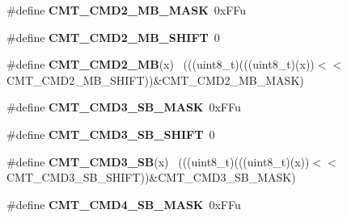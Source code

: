 \begin{DoxyCompactItemize}
\item 
\hypertarget{group___c_m_t___register___masks_gac9616164033684cd0d73e63eb6381441}{}\#define {\bfseries C\+M\+T\+\_\+\+C\+M\+D2\+\_\+\+M\+B\+\_\+\+M\+A\+S\+K}~0x\+F\+Fu\label{group___c_m_t___register___masks_gac9616164033684cd0d73e63eb6381441}

\item 
\hypertarget{group___c_m_t___register___masks_gaeff28d00f2825fc455b2f37c218ce24f}{}\#define {\bfseries C\+M\+T\+\_\+\+C\+M\+D2\+\_\+\+M\+B\+\_\+\+S\+H\+I\+F\+T}~0\label{group___c_m_t___register___masks_gaeff28d00f2825fc455b2f37c218ce24f}

\item 
\hypertarget{group___c_m_t___register___masks_gab2a79ddcd28a1921a654f06e9c9cb15f}{}\#define {\bfseries C\+M\+T\+\_\+\+C\+M\+D2\+\_\+\+M\+B}(x)                                                  ~(((uint8\+\_\+t)(((uint8\+\_\+t)(x))$<$$<$C\+M\+T\+\_\+\+C\+M\+D2\+\_\+\+M\+B\+\_\+\+S\+H\+I\+F\+T))\&C\+M\+T\+\_\+\+C\+M\+D2\+\_\+\+M\+B\+\_\+\+M\+A\+S\+K)\label{group___c_m_t___register___masks_gab2a79ddcd28a1921a654f06e9c9cb15f}

\item 
\hypertarget{group___c_m_t___register___masks_ga0ee814da2957c935fad8b236d52b22f5}{}\#define {\bfseries C\+M\+T\+\_\+\+C\+M\+D3\+\_\+\+S\+B\+\_\+\+M\+A\+S\+K}~0x\+F\+Fu\label{group___c_m_t___register___masks_ga0ee814da2957c935fad8b236d52b22f5}

\item 
\hypertarget{group___c_m_t___register___masks_ga87210814a860e3ea66f06747156fbd9a}{}\#define {\bfseries C\+M\+T\+\_\+\+C\+M\+D3\+\_\+\+S\+B\+\_\+\+S\+H\+I\+F\+T}~0\label{group___c_m_t___register___masks_ga87210814a860e3ea66f06747156fbd9a}

\item 
\hypertarget{group___c_m_t___register___masks_gaef6988a6aed5fc7ec042e6db619d568b}{}\#define {\bfseries C\+M\+T\+\_\+\+C\+M\+D3\+\_\+\+S\+B}(x)                                                  ~(((uint8\+\_\+t)(((uint8\+\_\+t)(x))$<$$<$C\+M\+T\+\_\+\+C\+M\+D3\+\_\+\+S\+B\+\_\+\+S\+H\+I\+F\+T))\&C\+M\+T\+\_\+\+C\+M\+D3\+\_\+\+S\+B\+\_\+\+M\+A\+S\+K)\label{group___c_m_t___register___masks_gaef6988a6aed5fc7ec042e6db619d568b}

\item 
\hypertarget{group___c_m_t___register___masks_ga634397e39fb458afba9c0cfefdfc36d8}{}\#define {\bfseries C\+M\+T\+\_\+\+C\+M\+D4\+\_\+\+S\+B\+\_\+\+M\+A\+S\+K}~0x\+F\+Fu\label{group___c_m_t___register___masks_ga634397e39fb458afba9c0cfefdfc36d8}


\end{DoxyCompactItemize}
